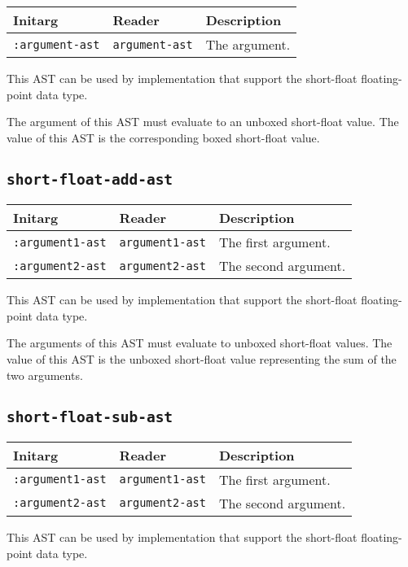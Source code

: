 \begin{tabular}{|l|l|l|}
\hline
Initarg & Reader & Description\\
\hline\hline
\texttt{:argument-ast} & \texttt{argument-ast} & The argument.\\
\hline
\end{tabular}

This AST can be used by implementation that support the short-float
floating-point data type.  

The argument of this AST must evaluate to an unboxed short-float
value.  The value of this AST is the corresponding boxed short-float
value.

\subsection{\texttt{short-float-add-ast}}
\label{sec-ast-short-float-add}

\begin{tabular}{|l|l|l|}
\hline
Initarg & Reader & Description\\
\hline\hline
\texttt{:argument1-ast} & \texttt{argument1-ast} & The first argument.\\
\hline
\texttt{:argument2-ast} & \texttt{argument2-ast} & The second argument.\\
\hline
\end{tabular}

This AST can be used by implementation that support the short-float
floating-point data type.  

The arguments of this AST must evaluate to unboxed short-float
values.  The value of this AST is the unboxed short-float value
representing the sum of the two arguments.

\subsection{\texttt{short-float-sub-ast}}
\label{sec-ast-short-float-sub}

\begin{tabular}{|l|l|l|}
\hline
Initarg & Reader & Description\\
\hline\hline
\texttt{:argument1-ast} & \texttt{argument1-ast} & The first argument.\\
\hline
\texttt{:argument2-ast} & \texttt{argument2-ast} & The second argument.\\
\hline
\end{tabular}

This AST can be used by implementation that support the short-float
floating-point data type.  

